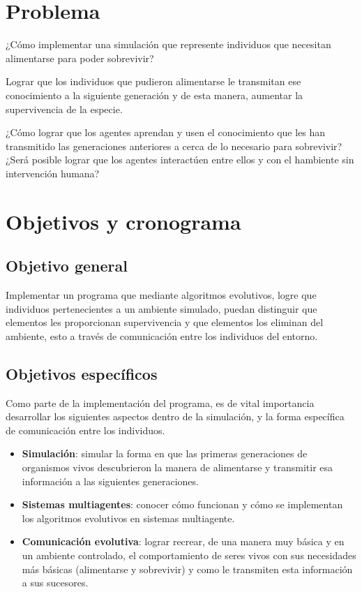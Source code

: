 \documentclass[times,10pt,twocolumn]{article}
\begin{document}
\section{Problema}
¿Cómo implementar una simulación que represente individuos que necesitan alimentarse para poder sobrevivir?\par
Lograr que los individuos que pudieron alimentarse le transmitan ese conocimiento a la siguiente generación y de esta manera, aumentar la supervivencia de la especie.\par
¿Cómo lograr que los agentes aprendan y usen el conocimiento que les han transmitido las generaciones anteriores a cerca de lo necesario para sobrevivir?
¿Será posible lograr que los agentes interactúen entre ellos y con el hambiente sin intervención humana?

\section{Objetivos y cronograma}

\subsection{Objetivo general}

Implementar un programa que mediante algoritmos evolutivos, logre que individuos pertenecientes a un ambiente simulado, puedan distinguir que elementos les proporcionan supervivencia y que elementos los eliminan del ambiente, esto a través de comunicación entre los individuos del entorno.

\subsection{Objetivos específicos}

Como parte de la implementación del programa, es de vital importancia desarrollar los siguientes aspectos dentro de la simulación, y la forma específica de comunicación entre los individuos.
\begin{itemize}
    \item \textbf{Simulación}: simular la forma en que las primeras generaciones de organismos vivos descubrieron la manera de alimentarse y transmitir esa información a las siguientes generaciones.
    \item \textbf{Sistemas multiagentes}: conocer cómo funcionan y cómo se implementan los algoritmos evolutivos en sistemas multiagente.
    \item \textbf{Comunicación evolutiva}: lograr recrear, de una manera muy básica y en un ambiente controlado, el comportamiento de seres vivos con sus necesidades más básicas (alimentarse y sobrevivir) y como le transmiten esta información a sus sucesores.
\end{itemize}
\end{document}
